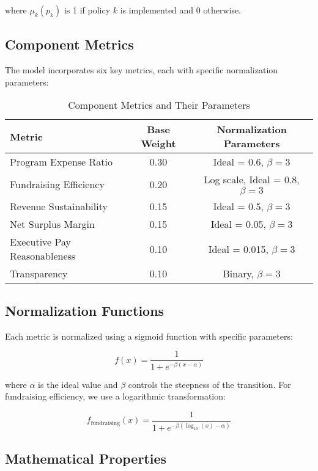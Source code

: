 \documentclass[12pt]{article}
\begin{document}
where $\mu_k(p_k)$ is 1 if policy $k$ is implemented and 0 otherwise.

\subsection{Component Metrics}

The model incorporates six key metrics, each with specific normalization parameters:

\begin{table}[h]
\centering
\begin{tabular}{|l|c|c|}
\hline
\textbf{Metric} & \textbf{Base Weight} & \textbf{Normalization Parameters} \\
\hline
Program Expense Ratio & 0.30 & Ideal = 0.6, $\beta = 3$ \\
Fundraising Efficiency & 0.20 & Log scale, Ideal = 0.8, $\beta = 3$ \\
Revenue Sustainability & 0.15 & Ideal = 0.5, $\beta = 3$ \\
Net Surplus Margin & 0.15 & Ideal = 0.05, $\beta = 3$ \\
Executive Pay Reasonableness & 0.10 & Ideal = 0.015, $\beta = 3$ \\
Transparency & 0.10 & Binary, $\beta = 3$ \\
\hline
\end{tabular}
\caption{Component Metrics and Their Parameters}
\label{tab:metrics}
\end{table}

\subsection{Normalization Functions}

Each metric is normalized using a sigmoid function with specific parameters:

\begin{equation}
    f(x) = \frac{1}{1 + e^{-\beta(x - \alpha)}}
\end{equation}

where $\alpha$ is the ideal value and $\beta$ controls the steepness of the transition. For fundraising efficiency, we use a logarithmic transformation:

\begin{equation}
    f_{\text{fundraising}}(x) = \frac{1}{1 + e^{-\beta(\log_{10}(x) - \alpha)}}
\end{equation}

\subsection{Mathematical Properties}
\end{document}
